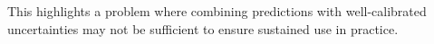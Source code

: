 This highlights a problem where combining predictions with well-calibrated uncertainties may not be sufficient to ensure sustained use in practice.




